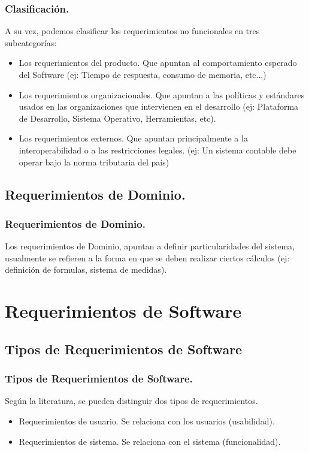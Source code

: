 \documentclass[12pt]{beamer}
\begin{document}
\begin{frame}
\frametitle{Clasificación.}
A su vez, podemos clasificar los requerimientos no funcionales en tres subcategorías:
\begin{itemize}
 \item<2 ->  Los requerimientos del \alert{producto}. Que apuntan al comportamiento esperado del Software (ej: Tiempo de respuesta, consumo de memoria, etc...)
 \item<3-> Los requerimientos \alert{organizacionales}. Que apuntan a las políticas y estándares usados en las organizaciones que intervienen en el desarrollo (ej: Plataforma de Desarrollo, Sistema Operativo, Herramientas, etc).
 \item<4-> Los requerimientos \alert{externos}. Que apuntan principalmente a la interoperabilidad o a las restricciones legales. (ej: Un sistema contable debe operar bajo la norma tributaria del país)
\end{itemize}
\end{frame}


\subsection{Requerimientos de Dominio.}
\begin{frame}
\frametitle{Requerimientos de Dominio.}
Los requerimientos de Dominio, apuntan a definir particularidades del sistema, usualmente se refieren a la forma en que se deben realizar ciertos cálculos (ej: definición de formulas, sistema de medidas).
\end{frame}

\section{Requerimientos de Software}
\subsection{Tipos de Requerimientos de Software}
\begin{frame}
\frametitle{Tipos de Requerimientos de Software.}
Según la literatura, se pueden distinguir dos tipos de requerimientos.
\begin{itemize}
 \item<2-> Requerimientos de usuario. Se relaciona con los usuarios (\alert{usabilidad}).
 \item<3-> Requerimientos de sistema. Se relaciona con el sistema (\alert{funcionalidad}).
\end{itemize}
\end{frame}
\end{document}
